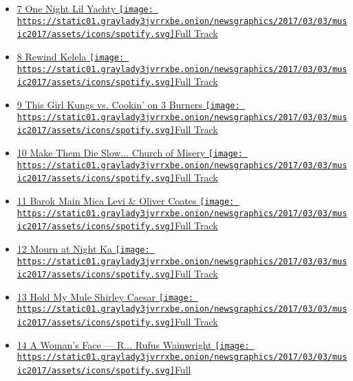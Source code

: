 \begin{itemize}
{  Track}
\item
  \protect\hyperlink{ux2flil-yachty-one-night}{ 7 One Night Lil Yachty }
  \href{https://open.spotify.com/track/40yJGQyEaBbIkXpwMFkXip}{\texttt{[image: https://static01.graylady3jvrrxbe.onion/newsgraphics/2017/03/03/music2017/assets/icons/spotify.svg]}Full
  Track}
\item
  \protect\hyperlink{ux2fkelela-rewind}{ 8 Rewind Kelela }
  \href{https://open.spotify.com/track/2adF8MLoBFPSh1mxXYgK9T}{\texttt{[image: https://static01.graylady3jvrrxbe.onion/newsgraphics/2017/03/03/music2017/assets/icons/spotify.svg]}Full
  Track}
\item
  \protect\hyperlink{ux2fkungs-vs-cookin-on-3-burners-this-girl}{ 9 This
  Girl Kungs vs. Cookin' on 3 Burners }
  \href{https://open.spotify.com/track/1A8j067qyiNwQnZT0bzUpZ}{\texttt{[image: https://static01.graylady3jvrrxbe.onion/newsgraphics/2017/03/03/music2017/assets/icons/spotify.svg]}Full
  Track}
\item
  \protect\hyperlink{ux2fchurch-of-misery-make-them-die-slowly-john-george-haigh}{
  10 Make Them Die Slow... Church of Misery }
  \href{https://open.spotify.com/track/08O2pHuPdcJ5PoxFqbpxLO}{\texttt{[image: https://static01.graylady3jvrrxbe.onion/newsgraphics/2017/03/03/music2017/assets/icons/spotify.svg]}Full
  Track}
\item
  \protect\hyperlink{ux2fmica-levi-oliver-coates-barok-main}{ 11 Barok
  Main Mica Levi \& Oliver Coates }
  \href{https://open.spotify.com/track/2Dy1MaumORP1kh1sHDXi0w}{\texttt{[image: https://static01.graylady3jvrrxbe.onion/newsgraphics/2017/03/03/music2017/assets/icons/spotify.svg]}Full
  Track}
\item
  \protect\hyperlink{ux2fka-mourn-at-night}{ 12 Mourn at Night Ka }
  \href{https://open.spotify.com/track/6zao3czBFKk1zbmIe3azJd}{\texttt{[image: https://static01.graylady3jvrrxbe.onion/newsgraphics/2017/03/03/music2017/assets/icons/spotify.svg]}Full
  Track}
\item
  \protect\hyperlink{ux2fshirley-caesar-hold-my-mule}{ 13 Hold My Mule
  Shirley Caesar }
  \href{https://open.spotify.com/track/0JjsI172ped2hF5v27o28J}{\texttt{[image: https://static01.graylady3jvrrxbe.onion/newsgraphics/2017/03/03/music2017/assets/icons/spotify.svg]}Full
  Track}
\item
  \protect\hyperlink{ux2frufus-wainwright-a-womans-face-reprise-sonnet-20}{
  14 A Woman's Face --- R... Rufus Wainwright }
  \href{https://open.spotify.com/track/5D12h7kioqQdCKzoDiUfvJ}{\texttt{[image: https://static01.graylady3jvrrxbe.onion/newsgraphics/2017/03/03/music2017/assets/icons/spotify.svg]}Full
}
\end{itemize}
